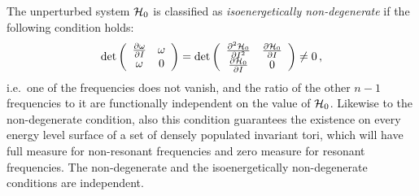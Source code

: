 The unperturbed system $\mathcal{H}_0$ is classified as \textit{isoenergetically non-degenerate} if the following condition holds:
\begin{equation}
    \operatorname{det}\left(\begin{array}{cc}
    \frac{\partial \omega}{\partial I} & \omega \\
    \omega & 0
    \end{array}\right)=\operatorname{det}\left(\begin{array}{cc}
    \frac{\partial^2 \mathcal{H}_0}{\partial I^2} & \frac{\partial \mathcal{H}_0}{\partial I} \\
    \frac{\partial \mathcal{H}_0}{\partial I} & 0
    \end{array}\right) \neq 0 \,,
\end{equation}
i.e.\ one of the frequencies does not vanish, and the ratio of the other $n-1$ frequencies to it are functionally independent on the value of $\mathcal{H}_0$. Likewise to the non-degenerate condition, also this condition guarantees the existence on every energy level surface of a set of densely populated invariant tori, which will have full measure for non-resonant frequencies and zero measure for resonant frequencies. The non-degenerate and the isoenergetically non-degenerate conditions are independent.

